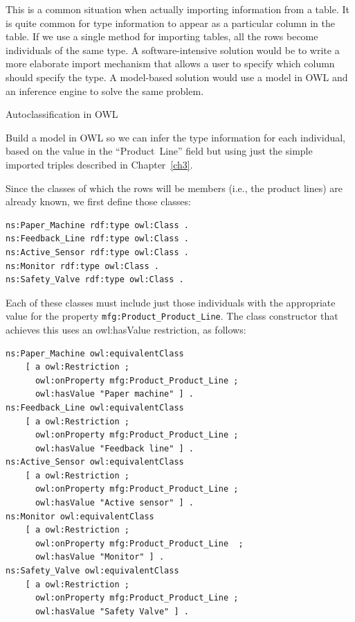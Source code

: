 This is a common situation when actually importing information from a
table. It is quite common for type information to appear as a particular
column in the table. If we use a single method for importing tables, all
the rows become individuals of the same type. A software-intensive
solution would be to write a more elaborate import mechanism that allows
a user to specify which column should specify the type. A model-based
solution would use a model in OWL and an inference engine to solve the
same problem.

\begin{challenge}{Autoclassification in OWL}
\label{ch:Autoclass}

Build a model in OWL so we can infer the type information for each
individual, based on the value in the ``Product\ Line'' 
field but using just the simple imported triples described in
Chapter~\ref{ch3}.

\solution

Since the classes of which the rows will be members (i.e., the product
lines) are already known, we first define those classes:

\begin{lstlisting}
ns:Paper_Machine rdf:type owl:Class .
ns:Feedback_Line rdf:type owl:Class .
ns:Active_Sensor rdf:type owl:Class .
ns:Monitor rdf:type owl:Class .
ns:Safety_Valve rdf:type owl:Class .
\end{lstlisting}

Each of these classes must include just those individuals with the
appropriate value for the property \texttt{mfg:Product\_Product\_Line}. The class
constructor that achieves this uses an owl:hasValue restriction, as
follows:

\begin{lstlisting}
ns:Paper_Machine owl:equivalentClass
    [ a owl:Restriction ;
      owl:onProperty mfg:Product_Product_Line ;
      owl:hasValue "Paper machine" ] .
ns:Feedback_Line owl:equivalentClass
    [ a owl:Restriction ;
      owl:onProperty mfg:Product_Product_Line ;
      owl:hasValue "Feedback line" ] .
ns:Active_Sensor owl:equivalentClass
    [ a owl:Restriction ;
      owl:onProperty mfg:Product_Product_Line ;
      owl:hasValue "Active sensor" ] .
ns:Monitor owl:equivalentClass
    [ a owl:Restriction ;
      owl:onProperty mfg:Product_Product_Line  ;
      owl:hasValue "Monitor" ] .
ns:Safety_Valve owl:equivalentClass
    [ a owl:Restriction ;
      owl:onProperty mfg:Product_Product_Line ;
      owl:hasValue "Safety Valve" ] .
\end{lstlisting}


\end{challenge}
